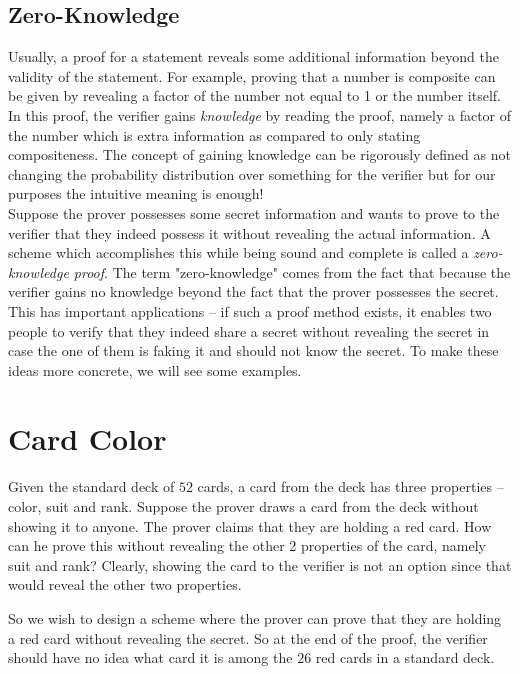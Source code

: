 \subsection*{Zero-Knowledge}
\noindent Usually, a proof for a statement reveals some additional information beyond the validity of the statement. 
For example, proving that a number is composite can be given by revealing a factor of the number 
not equal to 1 or the number itself. In this proof, the verifier gains \emph{knowledge} by reading the 
proof, namely a factor of the number which is extra information as compared to only stating compositeness. 
The concept of gaining knowledge can be rigorously defined as not changing the probability distribution over 
something for the verifier but for our purposes the intuitive meaning is enough!\\

\noindent Suppose the prover possesses some secret information and wants to prove to the verifier that they 
indeed possess it without revealing the actual information. A scheme which accomplishes this while being 
sound and complete is called a \emph{zero-knowledge proof}. The term "zero-knowledge" comes from the fact that 
because the verifier gains no knowledge beyond the fact that the prover possesses the secret. This has 
important applications -- if such a proof method exists, it enables two people to verify that 
they indeed share a secret without revealing the secret in case the 
one of them is faking it and should not know the secret. To make these ideas more concrete, we will see some 
examples.\\

\section{Card Color}
Given the standard deck of $52$ cards, a card from the deck has three properties -- color, suit and rank. 
Suppose the prover draws a card from the deck without showing it to anyone. The prover claims that they are 
holding a red card. How can he prove this without revealing the other 2 properties of the card, namely 
suit and rank? Clearly, showing the card to the verifier is not an option since that would reveal the other 
two properties.

So we wish to design a scheme where the prover can prove that they are holding a red card without revealing 
the secret. So at the end of the proof, the verifier should have no idea what card it is among the $26$ red 
cards in a standard deck. 

